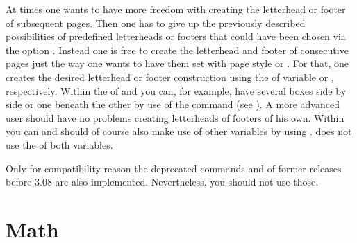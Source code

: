 \begin{Declaration}
\end{Declaration}
At times one wants to have more freedom with creating the letterhead or footer
of subsequent pages. Then one has to give up the previously described
possibilities of predefined letterheads or footers that could have been chosen
via the option . Instead one is
free to create the letterhead and footer of consecutive pages just the way one
wants to have them set with page style
 or
.  For that, one creates the
desired letterhead or footer construction using the  of
variable  or
, respectively. Within the  of
 and  you can, for example, have several
boxes side by side or one beneath the other by use of the 
command (see \cite{latex:usrguide}). A more advanced user should have no
problems creating letterheads of footers of his own.  Within 
you can and should of course also make use of other variables by using
. \KOMAScript{} does not use the  of both
variables.

Only for compatibility reason the deprecated commands  and
 of former 
releases before 3.08 are also implemented. Nevertheless, you should not use
those.%
%
\EndIndexGroup
%
\EndIndexGroup
%
\EndIndexGroup






\section{Math}
%
\BeginIndexGroup
{}%
%
%

